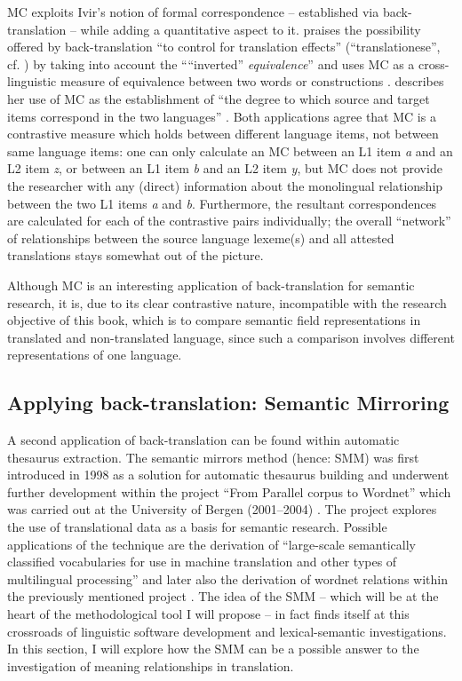 MC exploits Ivir’s notion of formal correspondence – established via back-translation – while adding a quantitative aspect to it. \citet{de_los_angeles_gomez_gonzalez_causative_2008} praises the possibility offered by back-translation “to control for translation effects” (“translationese”, cf. \citealt{wollin_translationese_1986}) by taking into account the “``inverted'' \textit{equivalence}” \citep[186]{de_los_angeles_gomez_gonzalez_causative_2008} and uses MC as a cross-linguistic measure of equivalence between two words or constructions \citep{de_los_angeles_gomez_gonzalez_causative_2008}. \citet{mortier_semantic_2010} describes her use of MC as the establishment of “the degree to which source and target items correspond in the two languages” \citep[410]{mortier_semantic_2010}. Both applications agree that MC is a contrastive measure which holds between different language items, not between same language items: one can only calculate an MC between an L1 item \textit{a} and an L2 item \textit{z}, or between an L1 item \textit{b} and an L2 item \textit{y}, but MC does not provide the researcher with any (direct) information about the monolingual relationship between the two L1 items \textit{a} and \textit{b}. Furthermore, the resultant correspondences are calculated for each of the contrastive pairs individually; the overall ``network'' of relationships between the source language lexeme(s) and all attested translations stays somewhat out of the picture.

Although MC is an interesting application of back-translation for semantic research, it is, due to its clear contrastive nature, incompatible with the research objective of this book, which is to compare semantic field representations in translated and non-translated language, since such a comparison involves different representations of one language.

\subsection{Applying back-translation: Semantic Mirroring}
\label{sec:2.3.4} 
A second application of back-translation can be found within automatic thesaurus extraction. The semantic mirrors method (hence: SMM) was first introduced in 1998 as a solution for automatic thesaurus building and underwent further development within the project “From Parallel corpus to Wordnet” which was carried out at the University of Bergen (2001--2004) \citep[311]{aijmer_translations_2004}. The project explores the use of translational data as a basis for semantic research. Possible applications of the technique are the derivation of “large-scale semantically classified vocabularies for use in machine translation and other types of multilingual processing” \citep[51]{johansson_translational_1998} and later also the derivation of wordnet relations within the previously mentioned project \citep[311]{aijmer_translations_2004}. The idea of the SMM – which will be at the heart of the methodological tool I will propose – in fact finds itself at this crossroads of linguistic software development and lexical-semantic investigations. In this section, I will explore how the SMM can be a possible answer to the investigation of meaning relationships in translation.

